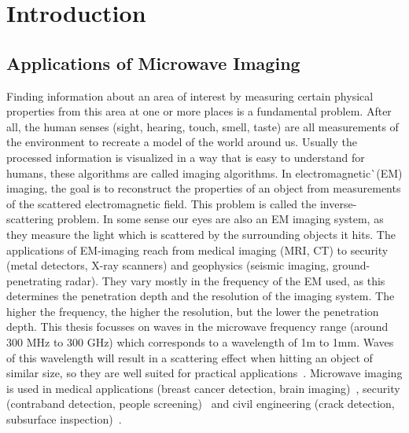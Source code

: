 
\chapter{Introduction}\label{chapter:introduction}

\section{Applications of Microwave Imaging}
Finding information about an area of interest by measuring certain physical properties from this area at one or more places is a fundamental problem.
After all, the human senses (sight, hearing, touch, smell, taste) are all measurements of the environment to recreate a model of the world around us.
Usually the processed information is visualized in a way that is easy to understand for humans, these algorithms are called imaging algorithms.
In electromagnetic^^ (EM) imaging, the goal is to reconstruct the properties of an object from measurements of the scattered electromagnetic field.
This problem is called the inverse-scattering problem.
In some sense our eyes are also an EM imaging system, as they measure the light  which is scattered by the surrounding objects it hits.
The applications of EM-imaging reach from medical imaging (MRI, CT) to security (metal detectors, X-ray scanners) and geophysics (seismic imaging, ground-penetrating radar).
They vary mostly in the frequency of the EM used, as this determines the penetration depth and the resolution of the imaging system.
The higher the frequency, the higher the resolution, but the lower the penetration depth.
This thesis focusses on waves in the microwave frequency range (around 300 MHz to 300 GHz) which corresponds to a wavelength of 1m to 1mm.
Waves of this wavelength will result in a scattering effect when hitting an object of similar size, so they are well suited for practical applications~\parencite{pastorino_microwave_2018}.
Microwave imaging is used in medical applications (breast cancer detection, brain imaging)~\parencite{wang_medical_2014}, security (contraband detection, people screening)~\parencite{ahmed_microwave_2021} and civil engineering (crack detection, subsurface inspection)~\parencite{pastorino_microwave_2018}.


